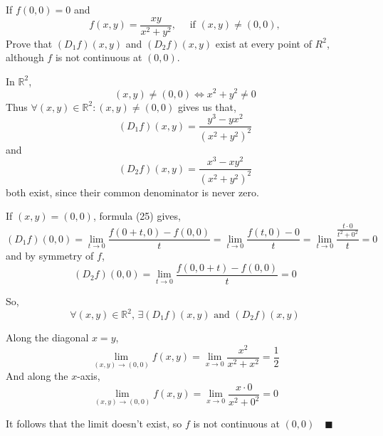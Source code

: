 \documentclass{article}
\newcommand\R{\mathbb{R}}
\begin{document}
If $f(0,0) = 0$ and \[ f(x,y) = \frac{xy}{x^2+y^2},\quad \text{ if
  }(x,y)\neq (0,0),\]
Prove that $(D_1 f)(x,y)$ and $(D_2 f)(x,y)$ exist at every point of
$R^2$, although $f$ is not continuous at $(0,0).$


In $\R^2$,
\[(x,y) \neq (0,0) \iff x^2+y^2 \neq 0\]
Thus $\forall (x,y)\in \R^2: (x,y)\neq (0,0)$ gives us that,
\begin{equation}
  (D_1 f)(x,y) =  \frac{y^3 -yx^2}{(x^2+y^2)^2}
\end{equation}
and
\begin{equation}
  (D_2 f)(x,y) =  \frac{x^3 -xy^2}{(x^2+y^2)^2}
\end{equation}
both exist, since their common denominator is never zero.


If $(x,y) = (0,0)$, formula (25) gives,
\begin{equation*}
(D_1 f)(0,0) = \lim_{t \rightarrow 0}
               \frac{f(0+t,0)-f(0,0)}{t}
  = \lim_{t \rightarrow 0}
    \frac{f(t,0)-0}{t}
  = \lim_{t \rightarrow 0}
    \frac{\frac{t\cdot 0}{t^2+ 0^2}}{t}
  = 0
\end{equation*}
and by symmetry of $f$,
\begin{equation*}
(D_2 f)(0,0) = \lim_{t \rightarrow 0}
               \frac{f(0,0+t)-f(0,0)}{t} = 0
\end{equation*}

So,\[\forall (x,y)\in \R^2,\,\exists (D_1 f)(x,y)\text{ and }(D_2 f)(x,y)\]

Along the diagonal $x = y$,
\[\lim_{(x,y) \rightarrow (0,0)} f(x,y) = \lim_{x \rightarrow 0}
  \frac{x^2}{x^2 + x^2} =   \frac{1}{2}\]
And along the $x$-axis,
\[\lim_{(x,y) \rightarrow (0,0)} f(x,y) = \lim_{x \rightarrow 0}
  \frac{x\cdot 0}{x^2 + 0^2} =  0\]

It follows that the limit doesn't exist, so $f$ is not continuous at $(0,0)\quad \blacksquare$
\end{document}
